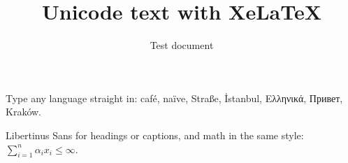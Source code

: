 \documentclass{article}
\title{Unicode text with XeLaTeX}
\author{Test document}
\date{}
\begin{document}
\maketitle

Type any language straight in: café, naïve, Straße, İstanbul, Ελληνικά,
Привет, Kraków.

\textsf{Libertinus Sans} for headings or captions, and math in the same
style: $∑_{i=1}^{n} α_i x_i ≤ ∞$.
\end{document}
